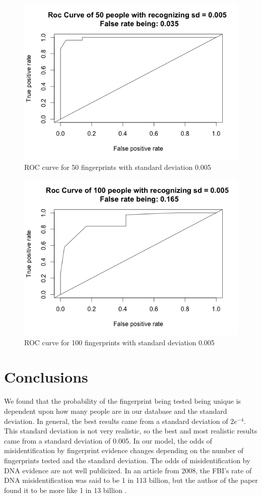 \documentclass[a4paper]{article}
\begin{document}
\begin{figure}
\centering
\includegraphics[width=13cm]{Roc4.png}
\caption{ROC curve for 50 fingerprints with standard deviation 0.005}
\label{fig:ROC4}
\end{figure}

\begin{figure}
\centering
\includegraphics[width=13cm]{Roc5.png}
\caption{ROC curve for 100 fingerprints with standard deviation 0.005}
\label{fig:ROC5}
\end{figure}

\newpage
\section{Conclusions}
We found that the probability of the fingerprint being tested being unique is dependent upon how many people are in our database and the standard deviation. In general, the best results came from a standard deviation of $2e^{-4}$. This standard deviation is not very realistic, so the best and most realistic results came from a standard deviation of 0.005. In our model, the odds of misidentification by fingerprint evidence changes depending on the number of fingerprints tested and the standard deviation. The odds of misidentification by DNA evidence are not well publicized. In an article from 2008, the FBI's rate of DNA misidentification was said to be 1 in 113 billion, but the author of the paper found it to be more like 1 in 13 billion \cite{DNA}. 

\newpage

\end{document}
